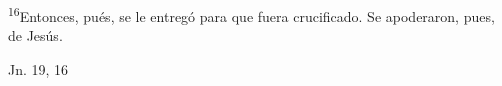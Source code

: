 \documentclass[../../rosario.tex]{subfiles}
\begin{document}
    \textsuperscript{16}Entonces, pués, se le entregó para que fuera crucificado. Se apoderaron, pues, de Jesús.
    \begin{flushright}
    Jn. 19, 16
    \end{flushright}
\end{document}
